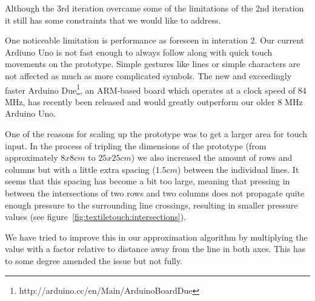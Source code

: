Although the 3rd iteration overcame some of the limitations of the 2nd iteration it still has some constraints that we would like to address.

One noticeable limitation is performance as foreseen in interation 2.
Our current Ardiuno Uno is not fast enough to always follow along with quick touch movements on the prototype.
Simple gestures like lines or simple characters are not affected as much as more complicated symbols.
The new and exceedingly faster Arduino Due\footnote{http://arduino.cc/en/Main/ArduinoBoardDue}, an ARM-based board which operates at a clock speed of 84 MHz, has recently been released and would greatly outperform our older 8 MHz Arduino Uno.

One of the reasons for scaling up the prototype was to get a larger area for touch input.
In the process of tripling the dimensions of the prototype (from approximately \(8x8cm\) to \(25x25cm\)) we also increased the amount of rows and columns but with a little extra spacing (\(1.5cm\)) between the individual lines.
It seems that this spacing has become a bit too large, meaning that pressing in between the intersections of two rows and two columns does not propagate quite enough pressure to the surrounding line crossings, resulting in smaller pressure values (see figure~\ref{fig:textiletouch:intersections}).

We have tried to improve this in our approximation algorithm by multiplying the value with a factor relative to distance away from the line in both axes.
This has to some degree amended the issue but not fully.

